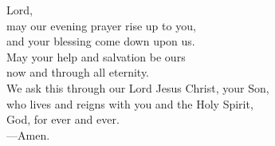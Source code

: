 \prayer


\begin{prayerverse}
Lord,\\
may our evening prayer rise up to you,\\
and your blessing come down upon us.\\
May your help and salvation be ours\\
now and through all eternity.\\
We ask this through our Lord Jesus Christ, your Son,\\
who lives and reigns with you and the Holy Spirit,\\
God, for ever and ever.\\
{\color{red}---\thinspace}Amen.
\end{prayerverse}

